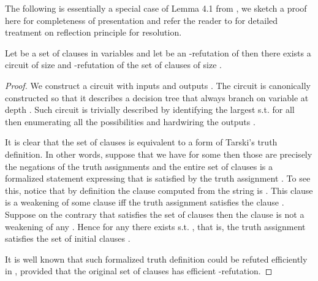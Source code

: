\documentclass{LMCS}
\theoremstyle{plain}\newtheorem{satz}[thm]{Satz}
\begin{document}
The following is essentially a special case of Lemma 4.1 from \cite{MR2058178}, we sketch a proof here for completeness of presentation and refer the reader to \cite{MR2039508} for detailed treatment on reflection principle for resolution.

\begin{lem}
\label{l_er}
Let  be a set of clauses in  variables and let  be an -refutation of  then there exists a circuit  of size  and -refutation of the set of clauses  of size .
\begin{proof}
We construct a circuit  with inputs  and outputs . The circuit  is canonically constructed so that it describes a decision tree that always branch on variable  at depth . Such circuit is trivially described by identifying the largest  s.t.  for all  then enumerating all the possibilities and hardwiring the outputs .

It is clear that the set of clauses  is equivalent to a form of Tarski's truth definition. In other words, suppose that we have  for some  then those  are precisely the negations of the truth assignments and the entire set of clauses  is a formalized statement expressing that  is satisfied by the truth assignment . To see this, notice that by definition the clause computed from the string  is . This clause is a weakening of some clause  iff the truth assignment  satisfies the clause . Suppose on the contrary that  satisfies the set of clauses  then the clause  is not a weakening of any . Hence for any  there exists  s.t. , that is, the truth assignment  satisfies the set of initial clauses .

It is well known that such formalized truth definition could be refuted efficiently in , provided that the original set of clauses  has efficient -refutation.
\end{proof}
\end{lem}
\end{document}
